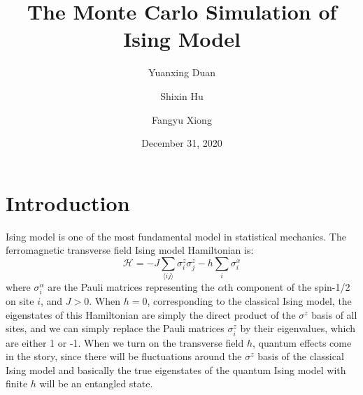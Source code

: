 \documentclass{article}
\title{The Monte Carlo Simulation of Ising Model}
\author{Yuanxing Duan}
\author{Shixin Hu}
\author{Fangyu Xiong}
\affil{School of Physics, Peking University}
\date{December 31, 2020}
\theoremstyle{plain} \newtheorem{thm}{Theorem}[section]
\theoremstyle{definition} \newtheorem{df}{Definition}[section]
\theoremstyle{definition} \newtheorem{eg}{Example}
\theoremstyle{remark} \newtheorem*{rmk}{Remark}
\begin{document}
\maketitle


\section{Introduction}
Ising model is one of the most fundamental model in statistical mechanics. The ferromagnetic transverse field Ising model Hamiltonian is:
\begin{equation}
	\mathcal{H}=-J\sum_{\langle ij\rangle}\sigma^z_i\sigma^z_j-h\sum_i\sigma_i^x
\end{equation}
where $\sigma_i^\alpha$ are the Pauli matrices representing the $\alpha$th component of the spin-1/2 on site $i$, and $J>0$. When $h=0$, corresponding to the classical Ising model, the eigenstates of this Hamiltonian are simply the direct product of the $\sigma^z$ basis of all sites, and we can simply replace the Pauli matrices $\sigma_i^z$ by their eigenvalues, which are either 1 or -1. When we turn on the transverse field $h$, quantum effects come in the story, since there will be fluctuations around the $\sigma^z$ basis of the classical Ising model and basically the true eigenstates of the quantum Ising model with finite $h$ will be an entangled state. 
\end{document}
